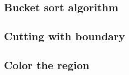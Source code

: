 \subsection{Bucket sort algorithm}

\subsection{Cutting with boundary}

\subsection{Color the region}
